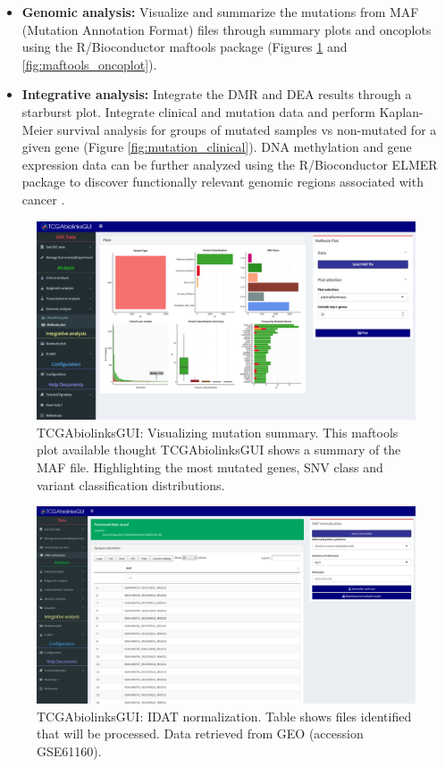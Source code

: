 \begin{itemize}
 	\item \textbf{Genomic analysis:} Visualize and summarize the mutations from MAF (Mutation Annotation Format) files through summary plots and oncoplots using the R/Bioconductor maftools package \cite{Gu20052016,Maftools} (Figures \ref{fig:maftools_summary} and \ref{fig:maftools_oncoplot}). %
	\item \textbf{Integrative analysis:} Integrate the DMR and DEA results through a starburst plot. Integrate clinical and mutation data and perform Kaplan-Meier survival analysis for groups of mutated samples vs non-mutated for a given gene (Figure \ref{fig:mutation_clinical}). DNA methylation and gene expression data can be further analyzed using the R/Bioconductor ELMER package to discover functionally relevant genomic regions associated with cancer \cite{yao2015inferring, ELMER2}.
\end{itemize}


\begin{figure}
\includegraphics[width=1.0\linewidth]{images/maftools_summary.png}
\caption[TCGAbiolinksGUI: Visualizing mutation summary]{TCGAbiolinksGUI: Visualizing mutation summary. This maftools plot available thought TCGAbiolinksGUI shows a summary of the MAF file. Highlighting the most mutated genes, SNV class and variant classification distributions. }
\label{fig:maftools_summary}
\end{figure}


  \begin{figure}[h!]
  \centering
  \includegraphics[width=1.0\textwidth]{images/idat.pdf}
  \caption{TCGAbiolinksGUI: IDAT normalization. Table shows files identified that will be processed. Data retrieved from GEO (accession GSE61160). }
  \label{fig:idat}
   \end{figure}
   
